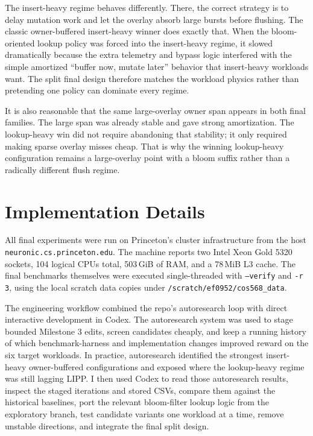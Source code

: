 \documentclass[11pt]{article}
\begin{document}
The insert-heavy regime behaves differently. There, the correct strategy is to delay mutation work and let the overlay absorb large bursts before flushing. The classic owner-buffered insert-heavy winner does exactly that. When the bloom-oriented lookup policy was forced into the insert-heavy regime, it slowed dramatically because the extra telemetry and bypass logic interfered with the simple amortized ``buffer now, mutate later'' behavior that insert-heavy workloads want. The split final design therefore matches the workload physics rather than pretending one policy can dominate every regime.

It is also reasonable that the same large-overlay owner span appears in both final families. The large span was already stable and gave strong amortization. The lookup-heavy win did not require abandoning that stability; it only required making sparse overlay misses cheap. That is why the winning lookup-heavy configuration remains a large-overlay point with a bloom suffix rather than a radically different flush regime.

\section{Implementation Details}
All final experiments were run on Princeton's cluster infrastructure from the host \texttt{neuronic.cs.princeton.edu}. The machine reports two Intel Xeon Gold 5320 sockets, 104 logical CPUs total, 503\,GiB of RAM, and a 78\,MiB L3 cache. The final benchmarks themselves were executed single-threaded with \texttt{--verify} and \texttt{-r 3}, using the local scratch data copies under \texttt{/scratch/ef0952/cos568\_data}.

The engineering workflow combined the repo's autoresearch loop with direct interactive development in Codex. The autoresearch system was used to stage bounded Milestone 3 edits, screen candidates cheaply, and keep a running history of which benchmark-harness and implementation changes improved reward on the six target workloads. In practice, autoresearch identified the strongest insert-heavy owner-buffered configurations and exposed where the lookup-heavy regime was still lagging LIPP. I then used Codex to read those autoresearch results, inspect the staged iterations and stored CSVs, compare them against the historical baselines, port the relevant bloom-filter lookup logic from the exploratory branch, test candidate variants one workload at a time, remove unstable directions, and integrate the final split design.
\end{document}

